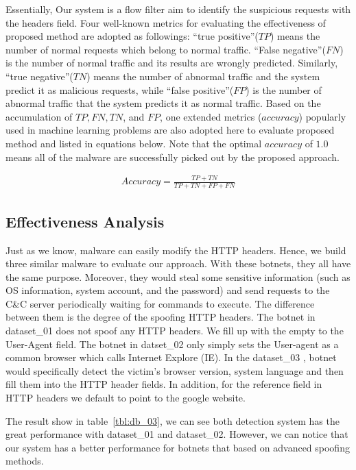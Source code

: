 Essentially, Our system is a flow filter aim to identify the suspicious requests with the headers field. Four well-known metrics for evaluating the effectiveness of proposed method are adopted as followings: ``true positive''($TP$) means the number of normal requests which belong to normal traffic. ``False negative''($FN$) is the number of normal traffic and its results are wrongly predicted. Similarly, ``true negative''($TN$) means the number of abnormal traffic and the system predict it as malicious requests, while ``false positive''($FP$) is the number of abnormal traffic that the system predicts it as normal traffic. Based on the accumulation of $TP, FN, TN$, and $FP$, one extended metrics ($accuracy$) popularly used in machine learning problems are also adopted here to evaluate proposed method and listed in equations below. Note that the optimal $accuracy$ of $1.0$ means all of the malware are successfully picked out by the proposed approach. 


\begin{eqnarray}
\label{eq:accuracy}
Accuracy = \frac{TP+TN}{TP+TN+FP+FN}
\end{eqnarray}

\subsection{Effectiveness Analysis}

Just as we know, malware can easily modify the HTTP headers. Hence, we build three similar malware to evaluate our approach. With these botnets, they all have the same purpose. Moreover, they would steal some sensitive information (such as OS information, system account, and the password) and send requests to the C\&C server periodically waiting for commands to execute. The difference between them is the degree of the spoofing HTTP headers. The botnet in dataset\_01 does not spoof any HTTP headers. We fill up with the empty to the User-Agent field. The botnet in datset\_02 only simply sets the User-agent as a common browser which calls Internet Explore (IE). In the dataset\_03 , botnet would specifically detect the victim's browser version, system language and then fill them into the HTTP header fields. In addition, for the reference field in HTTP headers we default to point to the google website. 

The result show in table~\ref{tbl:db_03}, we can see both detection system has the great performance with dataset\_01 and dataset\_02. However, we can notice that our system has a better performance for botnets that based on advanced spoofing methods.

